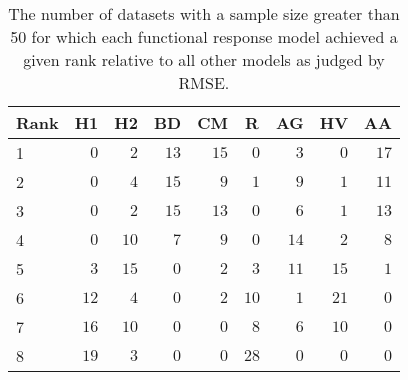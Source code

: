 \begin{table}[!tbp]
\caption{The number of datasets with a sample size greater than 50 for which each functional response model achieved a given rank relative to all other models as judged by RMSE.\label{table:RMSE_rankings_top50}} 
\begin{center}
\begin{tabular}{lrrrrrrrr}
\hline\hline
\multicolumn{1}{l}{Rank}&\multicolumn{1}{c}{H1}&\multicolumn{1}{c}{H2}&\multicolumn{1}{c}{BD}&\multicolumn{1}{c}{CM}&\multicolumn{1}{c}{R}&\multicolumn{1}{c}{AG}&\multicolumn{1}{c}{HV}&\multicolumn{1}{c}{AA}\tabularnewline
\hline
1&$ 0$&$ 2$&$13$&$15$&$ 0$&$ 3$&$ 0$&$17$\tabularnewline
2&$ 0$&$ 4$&$15$&$ 9$&$ 1$&$ 9$&$ 1$&$11$\tabularnewline
3&$ 0$&$ 2$&$15$&$13$&$ 0$&$ 6$&$ 1$&$13$\tabularnewline
4&$ 0$&$10$&$ 7$&$ 9$&$ 0$&$14$&$ 2$&$ 8$\tabularnewline
5&$ 3$&$15$&$ 0$&$ 2$&$ 3$&$11$&$15$&$ 1$\tabularnewline
6&$12$&$ 4$&$ 0$&$ 2$&$10$&$ 1$&$21$&$ 0$\tabularnewline
7&$16$&$10$&$ 0$&$ 0$&$ 8$&$ 6$&$10$&$ 0$\tabularnewline
8&$19$&$ 3$&$ 0$&$ 0$&$28$&$ 0$&$ 0$&$ 0$\tabularnewline
\hline
\end{tabular}\end{center}
\end{table}
